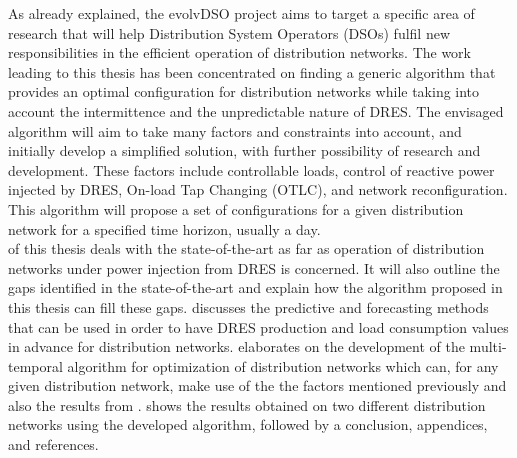 As already explained, the evolvDSO project aims to target a specific area of research that will help Distribution System Operators (DSOs) fulfil new responsibilities in the efficient operation of distribution networks. The work leading to this thesis has been concentrated on finding a generic algorithm that provides an optimal configuration for distribution networks while taking into account the intermittence and the unpredictable nature of DRES. The envisaged algorithm will aim to take many factors and constraints into account, and initially develop a simplified solution, with further possibility of research and development. These factors include controllable loads, control of reactive power injected by DRES, On-load Tap Changing (OTLC), and network reconfiguration. This algorithm will propose a set of configurations for a given distribution network for a specified time horizon, usually a day.\\

 of this thesis deals with the state-of-the-art as far as operation of distribution networks under power injection from DRES is concerned. It will also outline the gaps identified in the state-of-the-art and explain how the algorithm proposed in this thesis can fill these gaps.  discusses the predictive and forecasting methods that can be used in order to have DRES production and load consumption values in advance for distribution networks.  elaborates on the development of the multi-temporal algorithm for optimization of distribution networks which can, for any given distribution network, make use of the the factors mentioned previously and also the results from .  shows the results obtained on two different distribution networks using the developed algorithm, followed by a conclusion, appendices, and references.